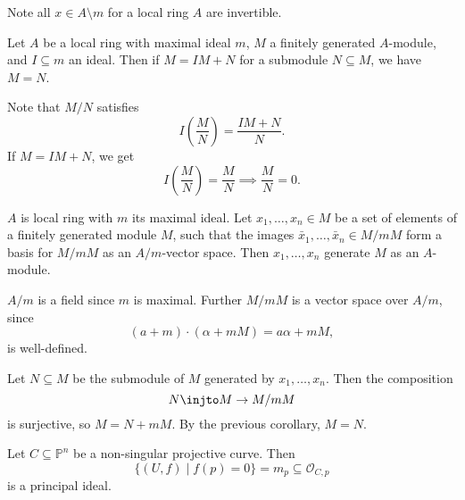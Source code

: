 \documentclass[12pt]{article}
\begin{document}
Note all $x \in A \setminus m$ for a local ring $A$ are invertible.

\begin{corollary}
	Let $A$ be a local ring with maximal ideal $m$, $M$ a finitely generated $A$-module, and $I \subseteq m$ an ideal. Then if $M = IM + N$ for a submodule $N \subseteq M$, we have $M = N$.
\end{corollary}

\begin{proofbox}
	Note that $M/N$ satisfies
	\[
	I \left( \frac{M}{N} \right)= \frac{IM + N}{N}.
	\]
	If $M = IM + N$, we get
	\[
	I \left(\frac{M}{N} \right) = \frac{M}{N} \implies \frac{M}{N} = 0.
	\]
\end{proofbox}

\begin{corollary}
	$A$ is local ring with $m$ its maximal ideal. Let $x_1, \ldots, x_n \in M$ be a set of elements of a finitely generated module $M$, such that the images $\bar x_1 ,\ldots, \bar x_n \in M/mM$ form a basis for $M/mM$ as an $A/m$-vector space. Then $x_1, \ldots, x_n$ generate $M$ as an $A$-module.
\end{corollary}

\begin{remark}
	$A/m$ is a field since $m$ is maximal. Further $M/mM$ is a vector space over $A/m$, since
	\[
		(a + m) \cdot (\alpha + m M) = a \alpha + m M,
	\]
	is well-defined.
\end{remark}

\begin{proofbox}
	Let $N \subseteq M$ be the submodule of $M$ generated by $x_1, \ldots, x_n$. Then the composition
	\[
	N \injto M \to M/mM
	\]
	is surjective, so $M = N + mM$. By the previous corollary, $M = N$.
\end{proofbox}


\begin{corollary}
	Let $C \subseteq \mathbb{P}^n$ be a non-singular projective curve. Then
	\[
		\{(U, f) \mid f(p) = 0\} = m_p \subseteq \mathcal{O}_{C, p}
	\]
	is a principal ideal.
\end{corollary}
\end{document}

